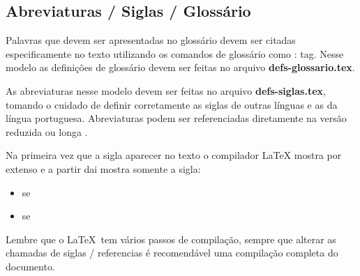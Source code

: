 \subsection{Abreviaturas / Siglas / Glossário}
\label{siglas-glossario}

Palavras que devem ser apresentadas no glossário devem ser citadas especificamente no texto utilizando os comandos de glossário como : \gls{tag}. Nesse modelo as definições de glossário devem ser feitas no arquivo \textbf{defs-glossario.tex}.

As abreviaturas nesse modelo devem ser feitas no arquivo \textbf{defs-siglas.tex}, tomando o cuidado de definir corretamente as siglas de outras línguas e as da língua portuguesa. Abreviaturas podem ser referenciadas diretamente na versão reduzida  \space  
ou longa .

Na primeira vez que a sigla aparecer no texto o compilador {\LaTeX} mostra por extenso e a partir dai mostra somente a sigla:

\begin{itemize}
    \item \gls{se}
    \item \gls{se}
\end{itemize}

Lembre que o \LaTeX \ tem vários passos de compilação, sempre que alterar as chamadas de siglas / referencias é recomendável uma compilação completa do documento.




